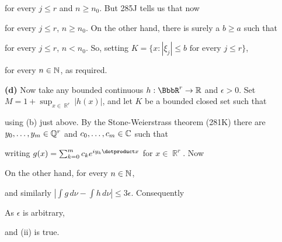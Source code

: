 {

\noindent for every $j\le r$ and $n\ge n_0$.   But 285J tells us that now


\noindent for every $j\le r$, $n\ge n_0$.   On the other hand, there is
surely a $b\ge a$ such that


\noindent for every $j\le r$, $n<n_0$.   So, setting
$K=\{x:|\xi_j|\le b\text{ for every }j\le r\}$,


\noindent for every $n\in\Bbb N$, as required.  \Qed

\medskip

{\bf (d)} Now take any bounded continuous $h:\BbbR^r\to\Bbb R$ and
$\epsilon>0$.   Set $M=1+\sup_{x\in\BbbR^r}|h(x)|$, and let $K$ be a
bounded closed set such that


\noindent using (b) just above.   By the
Stone-Weierstrass theorem (281K) there are $y_0,\ldots,y_m\in\Bbb Q^r$
and $c_0,\ldots,c_m\in\Bbb C$ such that



\noindent writing $g(x)=\sum_{k=0}^mc_ke^{iy_k\dotproduct x}$ for
$x\in\BbbR^r$.   Now


\noindent On the other hand, for every $n\in\Bbb N$,


\noindent and similarly $|\int g\,d\nu-\int h\,d\nu|\le 3\epsilon$.
Consequently


\noindent As $\epsilon$ is arbitrary,


\noindent and (ii) is true.
}%


